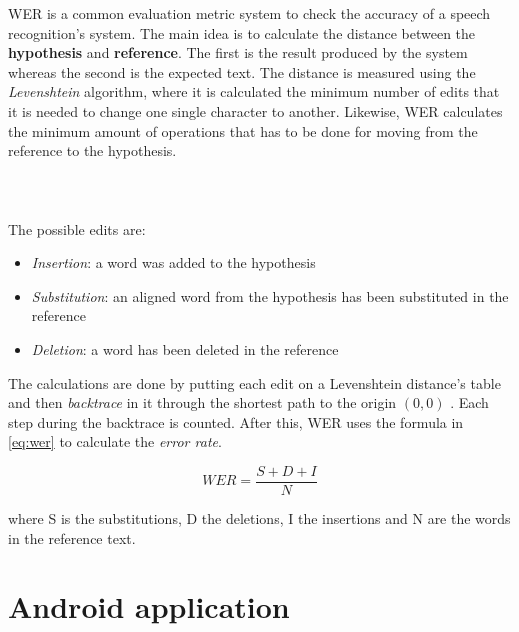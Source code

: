 \noindent WER is a common evaluation metric system to check the accuracy of a speech recognition's system. The main idea is to calculate the distance between the \textbf{hypothesis} and \textbf{reference}. The first is the result produced by the system whereas the second is the expected text. The distance is measured using the \textit{Levenshtein} algorithm, where it is calculated the minimum number of edits that it is needed to change one single character to another. Likewise, WER calculates the minimum amount of operations that has to be done for moving from the reference to the hypothesis. \\ \\ \\ \\

\noindent The possible edits are:

\begin{itemize}
	\item \textit{Insertion}: a word was added to the hypothesis
	\item \textit{Substitution}: an aligned word from the hypothesis has been substituted in the reference
	\item \textit{Deletion}: a word has been deleted in the reference
\end{itemize}

\noindent The calculations are done by putting each edit on a Levenshtein distance's table and then \textit{backtrace} in it through the shortest path to the origin $(0, 0)$ \cite{WER}. Each step during the backtrace is counted. After this, WER uses the formula in \ref{eq:wer} to calculate the \textit{error rate}.

\begin{equation}
\label{eq:wer}
	WER = \frac{S + D + I}{N}
\end{equation}

\noindent where S is the substitutions, D the deletions, I the insertions and N are the words in the reference text.




\section{Android application}
\label{sec:android_app}

